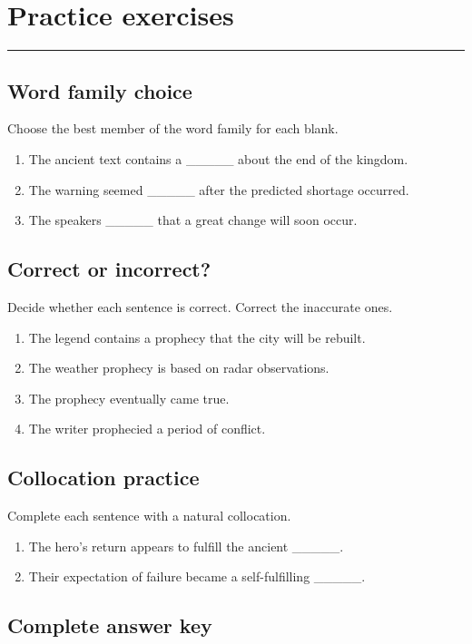 \documentclass[11pt]{article}
\newcommand{\sectionrule}{\par\vspace{-0.5em}\noindent\textcolor{Accent}{\rule{\linewidth}{0.6pt}}\par}
\begin{document}
\section{Practice exercises}
\sectionrule
\subsection{Word family choice}
Choose the best member of the word family for each blank.

\begin{enumerate}
  \item The ancient text contains a \_\_\_\_\_ about the end of the kingdom.
  \item The warning seemed \_\_\_\_\_ after the predicted shortage occurred.
  \item The speakers \_\_\_\_\_ that a great change will soon occur.
\end{enumerate}

\subsection{Correct or incorrect?}
Decide whether each sentence is correct. Correct the inaccurate ones.

\begin{enumerate}
  \item The legend contains a prophecy that the city will be rebuilt.
  \item The weather prophecy is based on radar observations.
  \item The prophecy eventually came true.
  \item The writer prophecied a period of conflict.
\end{enumerate}

\subsection{Collocation practice}
Complete each sentence with a natural collocation.

\begin{enumerate}
  \item The hero's return appears to fulfill the ancient \_\_\_\_\_.
  \item Their expectation of failure became a self-fulfilling \_\_\_\_\_.
\end{enumerate}

\subsection{Complete answer key}
\end{document}
